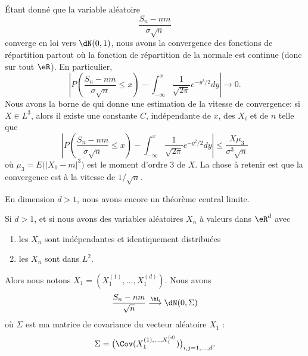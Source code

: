\begin{remark}
    Étant donné que la variable aléatoire 
    \begin{equation}
        \frac{ S_n-nm }{ \sigma\sqrt{n} }
    \end{equation}
    converge en loi vers \( \dN(0,1)\), nous avons la convergence des fonctions de répartition partout où la fonction de répartition de la normale est continue (donc sur tout \( \eR\)). En particulier,
    \begin{equation}
        \left| P\left( \frac{ S_n-nm }{ \sigma\sqrt{n} }\leq x \right)-\int_{-\infty}^x\frac{1}{ \sqrt{2\pi} } e^{-y^2/2}dy \right| \to 0.
    \end{equation}
    Nous avons la borne de  qui donne une estimation de la vitesse de convergence: si \( X\in L^3\), alors  il existe une constante \( C\), indépendante de \( x\), des \( X_i\) et de \( n\) telle que
    \begin{equation}
        \left| P\left( \frac{ S_n-nm }{ \sigma\sqrt{n} }\leq x \right)-\int_{-\infty}^x\frac{1}{ \sqrt{2\pi} } e^{-y^2/2}dy \right| \leq\frac{ X\mu_3 }{ \sigma^3\sqrt{n} }
    \end{equation}
    où \( \mu_3=E\big( | X_1-m |^3 \big)\) est le moment d'ordre \( 3\) de \( X\). La chose à retenir est que la convergence est à la vitesse de \( 1/\sqrt{n}\).
\end{remark}

En dimension \( d>1\), nous avons encore un théorème central limite.
\begin{theorem}
    Si \( d>1\), et si nous avons des variables aléatoires \( X_n\) à valeurs dans \( \eR^d\) avec
    \begin{enumerate}
        \item
            les \( X_n\) sont indépendantes et identiquement distribuées
        \item
            les \( X_n\) sont dans \( L^2\).
    \end{enumerate}
    Alors nous notons \( X_1=(X_1^{(1)},\ldots,X_1^{(d)})\). Nous avons
    \begin{equation}
        \frac{ S_n-nm }{ \sqrt{n} }\stackrel{\hL}{\longrightarrow}\dN(0,\Sigma)
    \end{equation}
    où \( \Sigma\) est ma matrice de covariance du vecteur aléatoire \( X_1\) :
    \begin{equation}
        \Sigma=\big( \Cov(X_1^{(1),\ldots,X_1^{(d)}}) \big)_{i,j=1,\ldots,d}.
    \end{equation}
\end{theorem}

